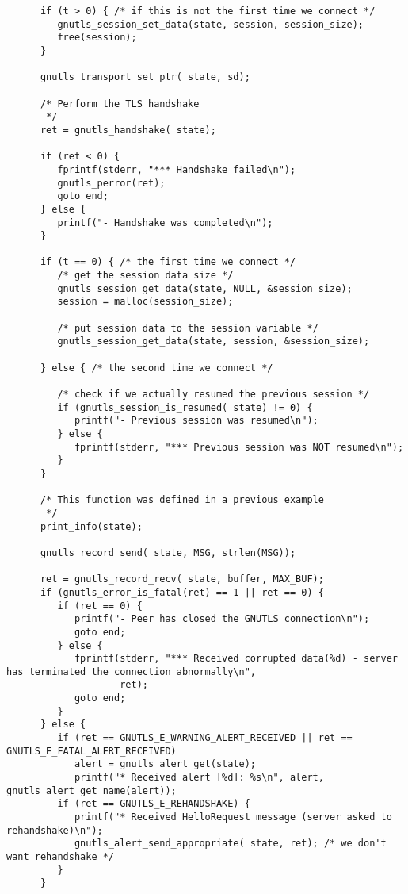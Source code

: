 \begin{verbatim}
      if (t > 0) { /* if this is not the first time we connect */
         gnutls_session_set_data(state, session, session_size);
         free(session);
      }
      
      gnutls_transport_set_ptr( state, sd);

      /* Perform the TLS handshake
       */
      ret = gnutls_handshake( state);

      if (ret < 0) {
         fprintf(stderr, "*** Handshake failed\n");
         gnutls_perror(ret);
         goto end;
      } else {
         printf("- Handshake was completed\n");
      }

      if (t == 0) { /* the first time we connect */
         /* get the session data size */
         gnutls_session_get_data(state, NULL, &session_size);
         session = malloc(session_size);

         /* put session data to the session variable */
         gnutls_session_get_data(state, session, &session_size);

      } else { /* the second time we connect */

         /* check if we actually resumed the previous session */
         if (gnutls_session_is_resumed( state) != 0) {
            printf("- Previous session was resumed\n");
         } else {
            fprintf(stderr, "*** Previous session was NOT resumed\n");
         }
      }

      /* This function was defined in a previous example
       */
      print_info(state);

      gnutls_record_send( state, MSG, strlen(MSG));

      ret = gnutls_record_recv( state, buffer, MAX_BUF);
      if (gnutls_error_is_fatal(ret) == 1 || ret == 0) {
         if (ret == 0) {
            printf("- Peer has closed the GNUTLS connection\n");
            goto end;
         } else {
            fprintf(stderr, "*** Received corrupted data(%d) - server has terminated the connection abnormally\n",
                    ret);
            goto end;
         }
      } else {
         if (ret == GNUTLS_E_WARNING_ALERT_RECEIVED || ret == GNUTLS_E_FATAL_ALERT_RECEIVED)
            alert = gnutls_alert_get(state);
            printf("* Received alert [%d]: %s\n", alert, gnutls_alert_get_name(alert));
         if (ret == GNUTLS_E_REHANDSHAKE) {
            printf("* Received HelloRequest message (server asked to rehandshake)\n");
            gnutls_alert_send_appropriate( state, ret); /* we don't want rehandshake */
         }
      }


\end{verbatim}
